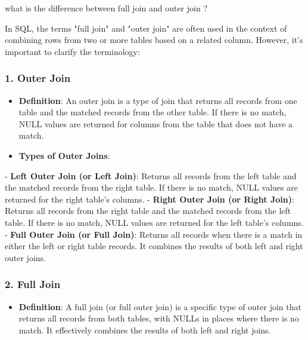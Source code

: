 \begin{userprompt}

what is the difference between full join and outer join ?

\end{userprompt}

\begin{botresponse}

In SQL, the terms "full join" and "outer join" are often used in the context of combining rows from two or more tables based on a related column. However, it's important to clarify the terminology:

\subsubsection{1. \textbf{Outer Join}}

\begin{itemize}
\item \textbf{Definition}: An outer join is a type of join that returns all records from one table and the matched records from the other table. If there is no match, NULL values are returned for columns from the table that does not have a match.
\item \textbf{Types of Outer Joins}:
\end{itemize}

- \textbf{Left Outer Join (or Left Join)}: Returns all records from the left table and the matched records from the right table. If there is no match, NULL values are returned for the right table's columns.
- \textbf{Right Outer Join (or Right Join)}: Returns all records from the right table and the matched records from the left table. If there is no match, NULL values are returned for the left table's columns.
- \textbf{Full Outer Join (or Full Join)}: Returns all records when there is a match in either the left or right table records. It combines the results of both left and right outer joins.

\subsubsection{2. \textbf{Full Join}}

\begin{itemize}
\item \textbf{Definition}: A full join (or full outer join) is a specific type of outer join that returns all records from both tables, with NULLs in places where there is no match. It effectively combines the results of both left and right joins.
\end{itemize}


\end{botresponse}

